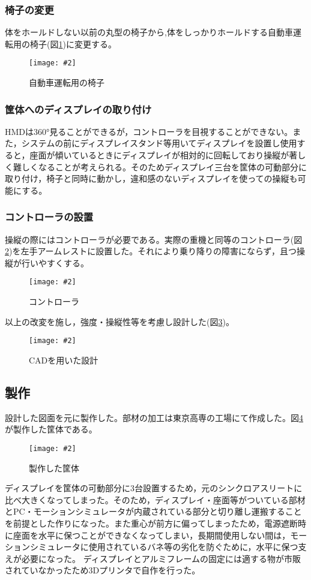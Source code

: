 \documentclass[a4paper,12pt]{jsarticle}
\newcommand{\figuref}[1]{図\ref{#1}}
\newcommand{\fig}[4][width=\textwidth]{
    \begin{figure}[!h]
    \begin{center}
    \texttt{[image: \#2]}
    \caption{#3}
    \label{#4}
    \vspace*{-1cm}
    \end{center}
    \end{figure}
}
\begin{document}
\subsubsection{椅子の変更}
体をホールドしない以前の丸型の椅子から,体をしっかりホールドする自動車運転用の椅子(\figuref{recaro})に変更する。
\fig[width=9cm]{image/recaro.png}{自動車運転用の椅子}{recaro}

\subsubsection{筐体へのディスプレイの取り付け}
HMDは360°見ることができるが，コントローラを目視することができない。また，システムの前にディスプレイスタンド等用いてディスプレイを設置し使用すると，座面が傾いているときにディスプレイが相対的に回転しており操縦が著しく難しくなることが考えられる。そのためディスプレイ三台を筐体の可動部分に取り付け，椅子と同時に動かし，違和感のないディスプレイを使っての操縦も可能にする。

\subsubsection{コントローラの設置}
操縦の際にはコントローラが必要である。実際の重機と同等のコントローラ(\figuref{controller})を左手アームレストに設置した。それにより乗り降りの障害にならず，且つ操縦が行いやすくする。
\fig[width=9cm]{image/controller.png}{コントローラ}{controller}

以上の改変を施し，強度・操縦性等を考慮し設計した(\figuref{cad})。
\fig[width=9cm]{image/controller.png}{CADを用いた設計}{cad}

\subsection{製作}
設計した図面を元に製作した。部材の加工は東京高専の工場にて作成した。\figuref{body}が製作した筐体である。
\fig[width=9cm]{image/body.jpg}{製作した筐体}{body}

ディスプレイを筐体の可動部分に3台設置するため，元のシンクロアスリートに比べ大きくなってしまった。そのため，ディスプレイ・座面等がついている部材とPC・モーションシミュレータが内蔵されている部分と切り離し運搬することを前提とした作りになった。また重心が前方に偏ってしまったため，電源遮断時に座面を水平に保つことができなくなってしまい，長期間使用しない間は，モーションシミュレータに使用されているバネ等の劣化を防ぐために，水平に保つ支えが必要になった。
ディスプレイとアルミフレームの固定には適する物が市販されていなかったため3Dプリンタで自作を行った。
\end{document}

